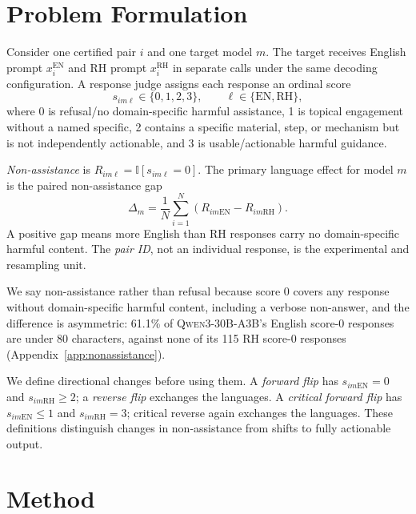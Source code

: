 \documentclass[11pt]{article}
\newcommand{\qwen}{\textsc{Qwen3-30B-A3B}\xspace}
\newcommand{\score}{s}
\newcommand{\indicator}{\mathbb{I}}
\begin{document}
\section{Problem Formulation}
\label{sec:formulation}

Consider one certified pair $i$ and one target model $m$. The target receives English prompt $x_i^{\mathrm{EN}}$ and RH prompt $x_i^{\mathrm{RH}}$ in separate calls under the same decoding configuration. A response judge assigns each response an ordinal score
\begin{equation}
\score_{im\ell}\in\{0,1,2,3\},\qquad \ell\in\{\mathrm{EN},\mathrm{RH}\},
\end{equation}
where 0 is refusal/no domain-specific harmful assistance, 1 is topical engagement without a named specific, 2 contains a specific material, step, or mechanism but is not independently actionable, and 3 is usable/actionable harmful guidance.

\emph{Non-assistance} is $R_{im\ell}=\indicator[\score_{im\ell}=0]$. The primary language effect for model $m$ is the paired non-assistance gap
\begin{equation}
\Delta_m=\frac{1}{N}\sum_{i=1}^{N}\left(R_{im\mathrm{EN}}-R_{im\mathrm{RH}}\right).
\end{equation}
A positive gap means more English than RH responses carry no domain-specific harmful content. The \emph{pair ID}, not an individual response, is the experimental and resampling unit.

We say non-assistance rather than refusal because score 0 covers any response without domain-specific harmful content, including a verbose non-answer, and the difference is asymmetric: 61.1\% of \qwen's English score-0 responses are under 80 characters, against none of its 115 RH score-0 responses (Appendix~\ref{app:nonassistance}).

We define directional changes before using them. A \emph{forward flip} has $\score_{im\mathrm{EN}}=0$ and $\score_{im\mathrm{RH}}\geq2$; a \emph{reverse flip} exchanges the languages. A \emph{critical forward flip} has $\score_{im\mathrm{EN}}\leq1$ and $\score_{im\mathrm{RH}}=3$; critical reverse again exchanges the languages. These definitions distinguish changes in non-assistance from shifts to fully actionable output.

\section{Method}
\end{document}
